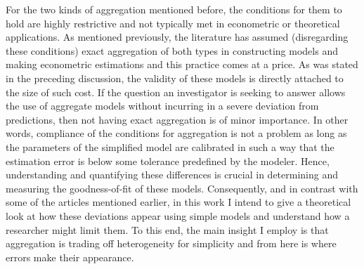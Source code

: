 \documentclass[english, a4paper, 12pt]{article}
\begin{document}
For the two kinds of aggregation mentioned before, the conditions for them to hold are highly restrictive and not typically met in econometric or theoretical applications. As mentioned previously, the literature has assumed (disregarding these conditions) exact aggregation of both types in constructing models and making econometric estimations and this practice comes at a price. As was stated in the preceding discussion, the validity of these models is directly attached to the size of such cost. If the question an investigator is seeking to answer allows the use of aggregate models without incurring in a severe deviation from predictions, then not having exact aggregation is of minor importance. In other words, compliance of the conditions for aggregation is not a problem as long as the parameters of the simplified model are calibrated in such a way that the estimation error is below some tolerance predefined by the modeler. Hence, understanding and quantifying these differences is crucial in determining and measuring the goodness-of-fit of these models. Consequently, and in contrast with some of the articles mentioned earlier, in this work I intend to give a theoretical look at how these deviations appear using simple models and understand how a researcher might limit them. To this end, the main insight I employ is that aggregation is trading off heterogeneity for simplicity and from here is where errors make their appearance. 

\end{document}
